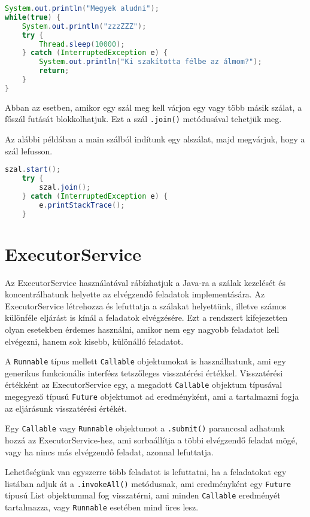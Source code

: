 \documentclass{article}
\let\l\lstinline
\begin{document}
\begin{lstlisting}[language=Java, caption=Szál futtatása megszakításig]
System.out.println("Megyek aludni");
while(true) {
	System.out.println("zzzZZZ");
	try {
		Thread.sleep(10000);
	} catch (InterruptedException e) {
		System.out.println("Ki szakította félbe az álmom?");
		return;
	}
}
\end{lstlisting}

Abban az esetben, amikor egy szál meg kell várjon egy vagy több másik szálat, a főszál futását blokkolhatjuk. Ezt a szál \l{.join()} metódusával tehetjük meg.

Az alábbi példában a main szálból indítunk egy alszálat, majd megvárjuk, hogy a szál lefusson.

\begin{lstlisting}[language=Java, caption=Szálak összekapcsolása]
	szal.start();
	try {
		szal.join();
	} catch (InterruptedException e) {
		e.printStackTrace();
	}
\end{lstlisting}

	\newpage

\section{ExecutorService}

Az ExecutorService használatával rábízhatjuk a Java-ra a szálak kezelését és koncentrálhatunk helyette az elvégzendő feladatok implementására. Az ExecutorService létrehozza és lefuttatja a szálakat helyettünk, illetve számos különféle eljárást is kínál a feladatok elvégzésére. Ezt a rendszert kifejezetten olyan esetekben érdemes használni, amikor nem egy nagyobb feladatot kell elvégezni, hanem sok kisebb, különálló feladatot.

A \l{Runnable} típus mellett \l{Callable} objektumokat is használhatunk, ami egy generikus funkcionális interfész tetszőleges visszatérési értékkel. Visszatérési értékként az ExecutorService egy, a megadott \l{Callable} objektum típusával megegyező típusú \l{Future} objektumot ad eredményként, ami a tartalmazni fogja az eljárásunk visszatérési értékét.

Egy \l{Callable} vagy \l{Runnable} objektumot a \l{.submit()} paranccsal adhatunk hozzá az ExecutorService-hez, ami sorbaállítja a többi elvégzendő feladat mögé, vagy ha nincs más elvégzendő feladat, azonnal lefuttatja.

Lehetőségünk van egyszerre több feladatot is lefuttatni, ha a feladatokat egy listában adjuk át a \l{.invokeAll()} metódusnak, ami eredményként egy \l{Future} típusú List objektummal fog visszatérni, ami minden \l{Callable} eredményét tartalmazza, vagy \l{Runnable} esetében mind üres lesz.
\end{document}
